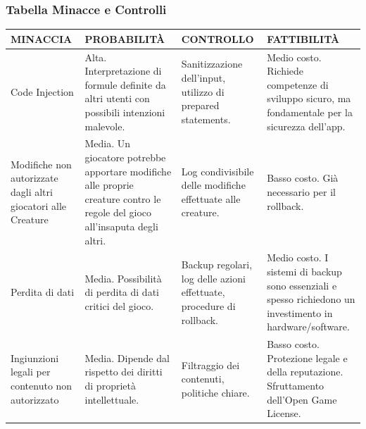 \documentclass[a4paper, 11pt]{article}
\begin{document}
\subsubsection*{Tabella Minacce e Controlli}
\begin{center}
    \begin{tabular}{|p{3cm}|p{3cm}|p{3cm}|p{3.5cm\RaggedRight}|}
        \hline
         \textbf{MINACCIA} & \textbf{PROBABILITÀ} & \textbf{CONTROLLO} & \textbf{FATTIBILITÀ} \\
         \hline
         Code Injection &Alta. Interpretazione di formule definite da altri utenti con possibili intenzioni malevole.& Sanitizzazione dell'input, utilizzo di prepared statements. & Medio costo. Richiede competenze di sviluppo sicuro, ma fondamentale per la sicurezza dell'app. \\
         \hline
         Modifiche non autorizzate dagli altri giocatori alle Creature & Media. Un giocatore potrebbe apportare modifiche alle proprie creature contro le regole del gioco all’insaputa degli altri. & Log condivisibile delle modifiche effettuate alle creature. & Basso costo. Già necessario per il rollback. \\
         \hline
         Perdita di dati & Media. Possibilità di perdita di dati critici del gioco. & Backup regolari, log delle azioni effettuate, procedure di rollback. & Medio costo. I sistemi di backup sono essenziali e spesso richiedono un investimento in hardware/software. \\
         \hline
         Ingiunzioni legali per contenuto non autorizzato & Media. Dipende dal rispetto dei diritti di proprietà intellettuale. & Filtraggio dei contenuti, politiche chiare. & Basso costo. Protezione legale e della reputazione. Sfruttamento dell’Open Game License. \\
         \hline
    \end{tabular}
\end{center}

\vspace{2em}
\end{document}
